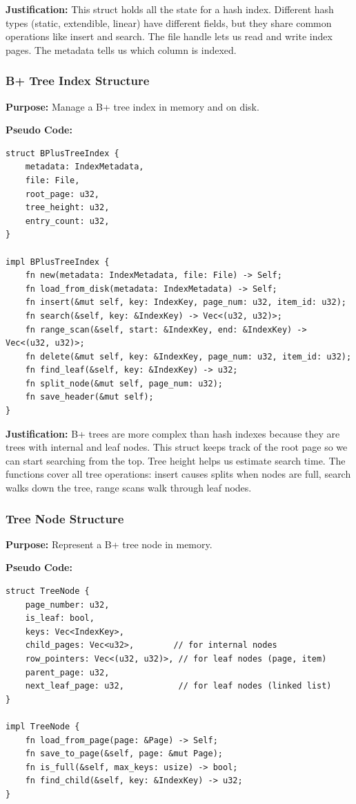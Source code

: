\documentclass[11pt,a4paper]{article}
\begin{document}
\textbf{Justification:} This struct holds all the state for a hash index. Different hash types (static, extendible, linear) have different fields, but they share common operations like insert and search. The file handle lets us read and write index pages. The metadata tells us which column is indexed.

\subsubsection{B+ Tree Index Structure}

\textbf{Purpose:} Manage a B+ tree index in memory and on disk.

\textbf{Pseudo Code:}
\begin{lstlisting}
struct BPlusTreeIndex {
    metadata: IndexMetadata,
    file: File,
    root_page: u32,
    tree_height: u32,
    entry_count: u32,
}

impl BPlusTreeIndex {
    fn new(metadata: IndexMetadata, file: File) -> Self;
    fn load_from_disk(metadata: IndexMetadata) -> Self;
    fn insert(&mut self, key: IndexKey, page_num: u32, item_id: u32);
    fn search(&self, key: &IndexKey) -> Vec<(u32, u32)>;
    fn range_scan(&self, start: &IndexKey, end: &IndexKey) -> Vec<(u32, u32)>;
    fn delete(&mut self, key: &IndexKey, page_num: u32, item_id: u32);
    fn find_leaf(&self, key: &IndexKey) -> u32;
    fn split_node(&mut self, page_num: u32);
    fn save_header(&mut self);
}
\end{lstlisting}

\textbf{Justification:} B+ trees are more complex than hash indexes because they are trees with internal and leaf nodes. This struct keeps track of the root page so we can start searching from the top. Tree height helps us estimate search time. The functions cover all tree operations: insert causes splits when nodes are full, search walks down the tree, range scans walk through leaf nodes.

\subsubsection{Tree Node Structure}

\textbf{Purpose:} Represent a B+ tree node in memory.

\textbf{Pseudo Code:}
\begin{lstlisting}
struct TreeNode {
    page_number: u32,
    is_leaf: bool,
    keys: Vec<IndexKey>,
    child_pages: Vec<u32>,        // for internal nodes
    row_pointers: Vec<(u32, u32)>, // for leaf nodes (page, item)
    parent_page: u32,
    next_leaf_page: u32,           // for leaf nodes (linked list)
}

impl TreeNode {
    fn load_from_page(page: &Page) -> Self;
    fn save_to_page(&self, page: &mut Page);
    fn is_full(&self, max_keys: usize) -> bool;
    fn find_child(&self, key: &IndexKey) -> u32;
}
\end{lstlisting}
\end{document}
